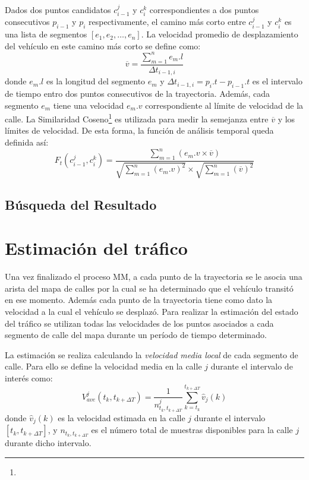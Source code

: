 Dados dos puntos candidatos $c_{i-1}^{j}$ y $c_{i}^{k}$ correspondientes a dos puntos consecutivos $p_{i-1}$ y $p_i$ respectivamente, el camino más corto entre $c_{i-1}^{j}$ y $c_{i}^{k}$ es una lista de segmentos $[e_1, e_2, \dots, e_n]$. La velocidad promedio de desplazamiento del vehículo en este camino más corto se define como:
\begin{equation}
\overline{v} = \frac { \sum_{m=1}^{n} {e_m.l} }{ \Delta t_{i-1, i} }
\end{equation}
donde $e_m.l$ es la longitud del segmento $e_m$ y $\Delta t_{i-1, i} = p_i.t - p_{i-1}.t$ es el intervalo de tiempo entro dos puntos consecutivos de la trayectoria. Además, cada segmento $e_m$ tiene una velocidad $e_m.v$ correspondiente al límite de velocidad de la calle. La Similaridad Coseno\footnote{} es utilizada para medir la semejanza entre $\overline{v}$ y los límites de velocidad. De esta forma, la función de análisis temporal queda definida así:
\begin{equation} \label{funcion_temporal}
F_{ t }(c_{ i-1 }^{ j },c_{ i }^{ k })=\frac { \sum _{ m=1 }^{ n }{ (e_{ m }.v\times \overline { v } ) }  }{ \sqrt { \sum _{ m=1 }^{ n }{ (e_{ m }.v)^{ 2 } }  } \times \sqrt { \sum _{ m=1 }^{ n }{ (\overline { v } )^{ 2 } }  }  } 
\end{equation}

\subsection{Búsqueda del Resultado}
\label{busqueda_de_resultado}


\section{Estimación del tráfico}
\label{estimacion_trafico}

Una vez finalizado el proceso MM, a cada punto de la trayectoria se le asocia una arista del mapa de calles por la cual se ha determinado que el vehículo transitó en ese momento. Además cada punto de la trayectoria tiene como dato la velocidad a la cual el vehículo se desplazó. Para realizar la estimación del estado del tráfico se utilizan todas las velocidades de los puntos asociados a cada segmento de calle del mapa durante un período de tiempo determinado.

La estimación se realiza calculando la \emph{velocidad media local} de cada segmento de calle. Para ello se define la velocidad media en la calle $j$ durante el intervalo de interés como:
\begin{equation}
\label{eq:velocidad_media}
{ V }_{ ave }^{ j }({ t }_{ k },{ t }_{ k+\Delta T })=\frac { 1 }{ { n }_{ { t }_{ k },{ t }_{ k+\Delta T } }^{ j } } \sum_{ k={ t }_{ k } }^{ { t }_{ k+\Delta T } }{ \hat { { v } } _{ j }(k) }
\end{equation}
donde ${ \hat { { v } } _{ j }(k) }$ es la velocidad estimada en la calle $j$ durante el intervalo $\left[ { t }_{ k },{ t }_{ k+\Delta T } \right] $, y ${ { n }_{ { t }_{ k },{ t }_{ k+\Delta T }}}$ es el número total de muestras disponibles para la calle $j$ durante dicho intervalo.

